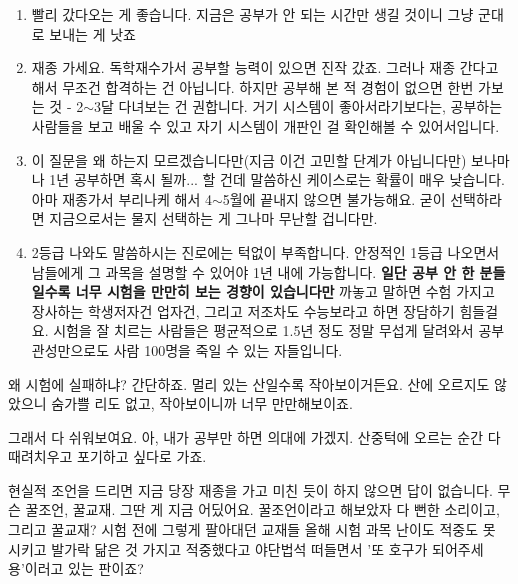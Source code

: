 \begin{enumerate}
    \item 빨리 갔다오는 게 좋습니다.
    지금은 공부가 안 되는 시간만 생길 것이니 그냥 군대로 보내는 게 낫죠
    \vspace{5mm}
    
    \item 재종 가세요.
    독학재수가서 공부할 능력이 있으면 진작 갔죠.
    그러나 재종 간다고 해서 무조건 합격하는 건 아닙니다.
    하지만 공부해 본 적 경험이 없으면 한번 가보는 것 - 2$\sim$3달 다녀보는 건 권합니다.
    거기 시스템이 좋아서라기보다는, 공부하는 사람들을 보고 배울 수 있고 자기 시스템이 개판인 걸 확인해볼 수 있어서입니다.
    \vspace{5mm}
    
    \item 이 질문을 왜 하는지 모르겠습니다만(지금 이건 고민할 단계가 아닙니다만)
    보나마나 1년 공부하면 혹시 될까... 할 건데 말씀하신 케이스로는 확률이 매우 낮습니다.
    아마 재종가서 부리나케 해서 4$\sim$5월에 끝내지 않으면 불가능해요.
    굳이 선택하라면 지금으로서는 물지 선택하는 게 그나마 무난할 겁니다만.
    \vspace{5mm}
    
    \item 2등급 나와도 말씀하시는 진로에는 턱없이 부족합니다. 안정적인 1등급 나오면서
    남들에게 그 과목을 설명할 수 있어야 1년 내에 가능합니다.
    \textbf{일단 공부 안 한 분들일수록 너무 시험을 만만히 보는 경향이 있습니다만}
    까놓고 말하면 수험 가지고 장사하는 학생저자건 업자건, 그리고 저조차도 수능보라고 하면 장담하기 힘들걸요.
    시험을 잘 치르는 사람들은 평균적으로 1.5년 정도 정말 무섭게 달려와서 공부관성만으로도 사람 100명을 죽일 수 있는 자들입니다.
\end{enumerate}
\vspace{5mm}

왜 시험에 실패하냐? 간단하죠. 멀리 있는 산일수록 작아보이거든요.
산에 오르지도 않았으니 숨가쁠 리도 없고, 작아보이니까 너무 만만해보이죠.
\vspace{5mm}

그래서 다 쉬워보여요. 아, 내가 공부만 하면 의대에 가겠지.
산중턱에 오르는 순간 다 때려치우고 포기하고 싶다로 가죠.
\vspace{5mm}

현실적 조언을 드리면 지금 당장 재종을 가고 미친 듯이 하지 않으면 답이 없습니다.
무슨 꿀조언, 꿀교재. 그딴 게 지금 어딨어요.
꿀조언이라고 해보았자 다 뻔한 소리이고, 그리고 꿀교재?
시험 전에 그렇게 팔아대던 교재들 올해 시험 과목 난이도 적중도 못 시키고
발가락 닮은 것 가지고 적중했다고 야단법석 떠들면서 '또 호구가 되어주세용'이러고 있는 판이죠?
\vspace{5mm}

